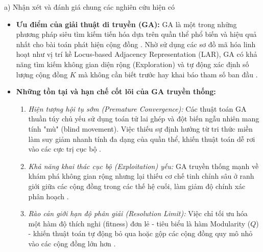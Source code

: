 \documentclass[14pt,a4paper]{extarticle}
\begin{document}
\noindent a) Nhận xét và đánh giá chung các nghiên cứu hiện có
\begin{itemize}
    \item \textbf{Ưu điểm của giải thuật di truyền (GA):} GA là một trong những phương pháp siêu tìm kiếm tiến hóa dựa trên quần thể phổ biến và hiệu quả nhất cho bài toán phát hiện cộng đồng \cite{Chen2019, Baraa2021}. Nhờ sử dụng các sơ đồ mã hóa linh hoạt như vị trí kề Locus-based Adjacency Representation (LAR), GA có khả năng tìm kiếm không gian diện rộng (Exploration) và tự động xác định số lượng cộng đồng $K$ mà không cần biết trước hay khai báo tham số ban đầu \cite{Chen2019}.
    \item \textbf{Những tồn tại và hạn chế cốt lõi của GA truyền thống:}
    \begin{enumerate}
        \item \textit{Hiện tượng hội tụ sớm (Premature Convergence):} Các thuật toán GA thuần túy chủ yếu sử dụng toán tử lai ghép và đột biến ngẫu nhiên mang tính "mù" (blind movement). Việc thiếu sự định hướng từ tri thức miền làm suy giảm nhanh tính đa dạng của quần thể, khiến thuật toán dễ rơi vào các cực trị cục bộ \cite{Chen2019}.
        \item \textit{Khả năng khai thác cục bộ (Exploitation) yếu:} GA truyền thống mạnh về khám phá không gian rộng nhưng lại thiếu cơ chế tinh chỉnh sâu ở ranh giới giữa các cộng đồng trong các thế hệ cuối, làm giảm độ chính xác phân hoạch \cite{Baraa2021}.
        \item \textit{Rào cản giới hạn độ phân giải (Resolution Limit):} Việc chỉ tối ưu hóa một hàm độ thích nghi (fitness) đơn lẻ - tiêu biểu là hàm Modularity ($Q$) - khiến thuật toán tự động bỏ qua hoặc gộp các cộng đồng quy mô nhỏ vào các cộng đồng lớn hơn \cite{Baraa2021}.
    \end{enumerate}
\end{itemize}
\end{document}
